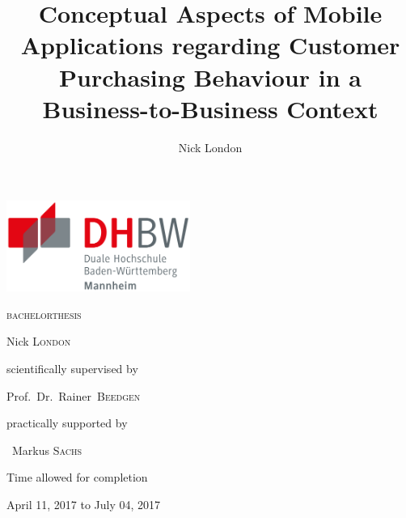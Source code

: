 \documentclass[12pt,a4paper,final,oneside,openright,onecolumn,titlepage]{book}
\author{Nick London}
\title{Conceptual Aspects of Mobile Applications regarding Customer Purchasing Behaviour in a Business-to-Business Context}
\newcounter{savepage}
\begin{document}
\begin{titlepage}
	\includegraphics[height=8em]{img/logos/dhbw.pdf}
	\hfill
	\par
	\centering
	\vfill
	{\huge \textsc{\MakeLowercase{Bachelorthesis}}\par}
	\vspace{2em}
	{\Huge \textbf{\thetitle}\par}
	\vspace{1.5em}
	{\large Nick \textsc{London}\par}
	\vfill
	{scientifically supervised by\par Prof.~Dr.~Rainer~\textsc{Beedgen}\par}
	\par\vspace{1em}
	{practically supported by\par ~Markus \textsc{Sachs}\par}
	\vspace{2em}
	{Time allowed for completion\par April 11, 2017 to July 04, 2017\par}
\end{titlepage}

\setcounter{page}{1}

\tableofcontents

\newpage
{}
\listoffigures

\newpage
{}
\listoftables

\newpage
{}
\setcounter{page}{1}


%



\end{document}
